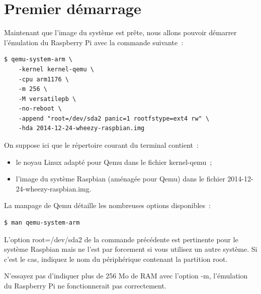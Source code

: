 \documentclass{article}
\begin{document}





\section{Premier démarrage}\label{sec:first-boot}

Maintenant que l'image du système est prête, nous allons pouvoir démarrer
l'émulation du Raspberry Pi avec la commande suivante~:
\begin{verbatim}
$ qemu-system-arm \
    -kernel kernel-qemu \
    -cpu arm1176 \
    -m 256 \
    -M versatilepb \
    -no-reboot \
    -append "root=/dev/sda2 panic=1 rootfstype=ext4 rw" \
    -hda 2014-12-24-wheezy-raspbian.img
\end{verbatim}

On suppose ici que le répertoire courant du terminal contient~:
\begin{itemize}
    \item le noyau Linux adapté pour Qemu dans le fichier
        \og{}kernel-qemu\fg{}~;
    \item l'image du système Raspbian (aménagée pour Qemu) dans le fichier
        \og{}2014-12-24-wheezy-raspbian.img\fg{}.
\end{itemize}

La manpage de Qemu détaille les nombreuses options disponibles~:
\begin{verbatim}
$ man qemu-system-arm
\end{verbatim}

L'option \og{}root=/dev/sda2\fg{} de la commande précédente est pertinente pour
le système Raspbian mais ne l'est par forcement si vous utilisez un autre
système. Si c'est le cas, indiquez le nom du périphérique contenant la
partition root.

N'essayez pas d'indiquer plus de 256 Mo de RAM avec l'option \og{}-m\fg{},
l'émulation du Raspberry Pi ne fonctionnerait pas correctement.
\end{document}
